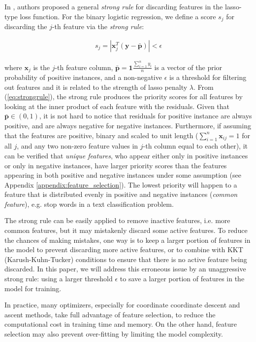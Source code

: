 In \cite{tibshirani2012strong}, authors proposed a general \textit{strong rule} for discarding features in the lasso-type loss function. For the binary logistic regression, we define a score $s_j$ for discarding the $j$-th feature via the \textit{strong rule}:

\begin{align}
    s_j = |\pmb{x}_j^T (\pmb{y} - \pmb{\bar{p}})| < \epsilon
    \label{eq:strongrule}
\end{align}

where $\pmb{x}_j$ is the $j$-th feature column, $\pmb{\bar{p}} = \pmb{1} \frac{\sum_{i=1}^n y_i}{n}$ is a vector of the prior probability of positive instances, and a non-negative $\epsilon$ is a threshold for filtering out features and it is related to the strength of lasso penalty $\lambda$. From (\ref{eq:strongrule}), the strong rule produces the priority scores for all features by looking at the inner product of each feature with the residuals. Given that $\bar{\pmb{p}} \in (0,1)$, it is not hard to notice that residuals for positive instance are always positive, and are always negative for negative instances. Furthermore, if assuming that the features are positive, binary and scaled to unit length ($\sum_{i=1}^{n} \pmb{x}_{ij} = 1 $ for all $j$, and any two non-zero feature values in $j$-th column equal to each other), it can be verified that \textit{unique features}, who appear either only in positive instances or only in negative instances, have larger priority scores than the features appearing in both positive and negative instances under some assumption (see Appendix \ref{appendix:feature_selection}). The lowest priority will happen to a feature that is distributed evenly in positive and negative instances (\textit{common feature}), e.g. stop words in a text classification problem. 

The strong rule can be easily applied to remove inactive features, i.e. more common features, but it may mistakenly discard some active features. To reduce the chances of making mistakes, one way is to keep a larger portion of features in the model to prevent discarding more active features, or to combine with KKT (Karush-Kuhn-Tucker) conditions to ensure that there is no active feature being discarded\cite{tibshirani2012strong}. In this paper, we will address this erroneous issue by an unaggressive strong rule: using a larger threshold $\epsilon$ to save a larger portion of features in the model for training. 

In practice, many optimizers, especially for coordinate coordinate descent and ascent methods\cite{friedman2010regularization}, take full advantage of feature selection, to reduce the computational cost in training time and memory. On the other hand, feature selection may also prevent over-fitting by limiting the model complexity\cite{reunanen2003overfitting}. 

